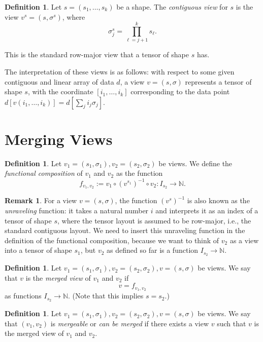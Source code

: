 \documentclass{article}
\theoremstyle{definition} %
\newtheorem{definition}[theorem]{Definition}
\newtheorem{remark}[theorem]{Remark}
\newcommand{\bN}{\mathbb{N}}
\newcommand{\defn}[1]{\textit{#1}}
\begin{document}
\begin{definition}
  Let $s = (s_1, \ldots, s_k)$ be a shape.
  The \defn{contiguous view} for $s$ is the view $v^s = (s, \sigma^s)$, where
  \[
    \sigma^s_j = \prod_{\ell=j+1}^{k} s_\ell.
  \]
\end{definition}
This is the standard row-major view that a tensor of shape $s$ has.


The interpretation of these views is as follows:
with respect to some given contiguous and linear array of data $d$,
a view $v = (s, \sigma)$ represents a tensor of shape $s$, with the coordinate $[i_1, \ldots, i_k]$ corresponding to the data point 
  $d\left[ v(i_1, \ldots, i_k) \right] = d\left[ \sum_j i_j \sigma_j \right]$.

\section{Merging Views}

\begin{definition}
  \label{def:functional-composition}
  Let $v_1 = (s_1, \sigma_1), v_2 = (s_2, \sigma_2)$ be views.
  We define the \defn{functional composition} of $v_1$ and $v_2$ as the function
  \[
    f_{v_1, v_2} := v_1 \circ (v^{s_1})^{-1} \circ v_2 \colon I_{s_2} \to \bN.
  \]
\end{definition}

\begin{remark}
  \label{rem:unraveling}
  For a view $v = (s, \sigma)$,
  the function $(v^s)^{-1}$ is also known as the \defn{unraveling} function:
  it takes a natural number $i$ and interprets it as an index of a tensor of shape $s$,
  where the tensor layout is assumed to be row-major, i.e., the standard contiguous layout.
  We need to insert this unraveling function in the definition of the functional composition,
  because we want to think of $v_2$ as a view into a tensor of shape $s_1$,
  but $v_2$ as defined so far is a function $I_{s_2} \to \bN$.
\end{remark}

\begin{definition}
  \label{def:merged-view}
  Let $v_1 = (s_1, \sigma_1), v_2 = (s_2, \sigma_2), v = (s, \sigma)$ be views.
  We say that $v$ is the \defn{merged view} of $v_1$ and $v_2$ if
  \[
    v = f_{v_1, v_2}
  \]
  as functions $I_{s_2} \to \bN$. (Note that this implies $s = s_2$.)
\end{definition}

\begin{definition}
  \label{def:mergeable}
  Let $v_1 = (s_1, \sigma_1), v_2 = (s_2, \sigma_2), v = (s, \sigma)$ be views.
  We say that $(v_1, v_2)$ is \defn{mergeable} or \defn{can be merged}
  if there exists a view $v$ such that $v$ is the merged view of $v_1$ and $v_2$.
\end{definition}
\end{document}
